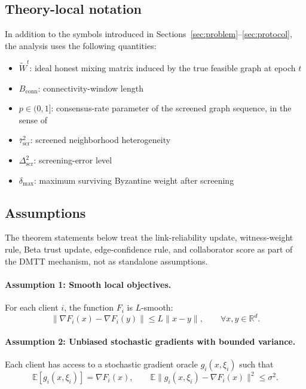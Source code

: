 \documentclass[journal]{IEEEtran}
\theoremstyle{definition}
\theoremstyle{remark}
\begin{document}
\subsection{Theory-local notation}

In addition to the symbols introduced in Sections~\ref{sec:problem}--\ref{sec:protocol}, the analysis uses the following quantities:

\begin{itemize}
    \item $\widetilde W^t$: ideal honest mixing matrix induced by the true feasible graph at epoch $t$
    \item $B_{\mathrm{conn}}$: connectivity-window length
    \item $p\in(0,1]$: consensus-rate parameter of the screened graph sequence, in the sense of \cite{koloskova2020unified}
    \item $\bar\tau_{\mathrm{scr}}^2$: screened neighborhood heterogeneity
    \item $\Delta_{\mathrm{scr}}^2$: screening-error level
    \item $\delta_{\max}$: maximum surviving Byzantine weight after screening
\end{itemize}

\subsection{Assumptions}

The theorem statements below treat the link-reliability update, witness-weight rule, Beta trust update, edge-confidence rule, and collaborator score as part of the DMTT mechanism, not as standalone assumptions.

\paragraph{Assumption 1: Smooth local objectives.}
For each client $i$, the function $F_i$ is $L$-smooth:
$$
\|\nabla F_i(x)-\nabla F_i(y)\| \le L\|x-y\|,
\qquad
\forall x,y\in\mathbb R^d.
$$

\paragraph{Assumption 2: Unbiased stochastic gradients with bounded variance.}
Each client has access to a stochastic gradient oracle $g_i(x,\xi_i)$ such that
$$
\mathbb E[g_i(x,\xi_i)] = \nabla F_i(x),
\qquad
\mathbb E\|g_i(x,\xi_i)-\nabla F_i(x)\|^2 \le \sigma^2.
$$
\end{document}
